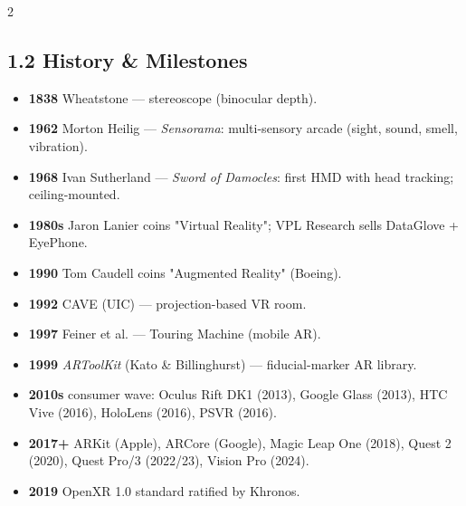 \begin{paracol}{2}
\subsection*{1.2 History \& Milestones}
\begin{itemize}[leftmargin=*,nosep]
  \item \textbf{1838} Wheatstone — stereoscope (binocular depth).
  \item \textbf{1962} Morton Heilig — \emph{Sensorama}: multi-sensory arcade (sight, sound, smell, vibration).
  \item \textbf{1968} Ivan Sutherland — \emph{Sword of Damocles}: first HMD with head tracking; ceiling-mounted.
  \item \textbf{1980s} Jaron Lanier coins "Virtual Reality"; VPL Research sells DataGlove + EyePhone.
  \item \textbf{1990} Tom Caudell coins "Augmented Reality" (Boeing).
  \item \textbf{1992} CAVE (UIC) — projection-based VR room.
  \item \textbf{1997} Feiner et al. — Touring Machine (mobile AR).
  \item \textbf{1999} \emph{ARToolKit} (Kato \& Billinghurst) — fiducial-marker AR library.
  \item \textbf{2010s} consumer wave: Oculus Rift DK1 (2013), Google Glass (2013), HTC Vive (2016), HoloLens (2016), PSVR (2016).
  \item \textbf{2017+} ARKit (Apple), ARCore (Google), Magic Leap One (2018), Quest 2 (2020), Quest Pro/3 (2022/23), Vision Pro (2024).
  \item \textbf{2019} OpenXR 1.0 standard ratified by Khronos.
\end{itemize}

\switchcolumn


\end{paracol}
